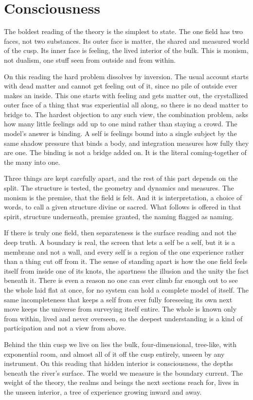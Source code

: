\section{Consciousness}

The boldest reading of the theory is the simplest to state. The one field has two faces, not two substances. Its outer face is matter, the shared and measured world of the cusp. Its inner face is feeling, the lived interior of the bulk. This is monism, not dualism, one stuff seen from outside and from within.

On this reading the hard problem dissolves by inversion. The usual account starts with dead matter and cannot get feeling out of it, since no pile of outside ever makes an inside. This one starts with feeling and gets matter out, the crystallized outer face of a thing that was experiential all along, so there is no dead matter to bridge to. The hardest objection to any such view, the combination problem, asks how many little feelings add up to one mind rather than staying a crowd. The model's answer is binding. A self is feelings bound into a single subject by the same shadow pressure that binds a body, and integration measures how fully they are one. The binding is not a bridge added on. It is the literal coming-together of the many into one.

Three things are kept carefully apart, and the rest of this part depends on the split. The structure is tested, the geometry and dynamics and measures. The monism is the premise, that the field is felt. And it is interpretation, a choice of words, to call a given structure divine or sacred. What follows is offered in that spirit, structure underneath, premise granted, the naming flagged as naming.

If there is truly one field, then separateness is the surface reading and not the deep truth. A boundary is real, the screen that lets a self be a self, but it is a membrane and not a wall, and every self is a region of the one experience rather than a thing cut off from it. The sense of standing apart is how the one field feels itself from inside one of its knots, the apartness the illusion and the unity the fact beneath it. There is even a reason no one can ever climb far enough out to see the whole laid flat at once, for no system can hold a complete model of itself. The same incompleteness that keeps a self from ever fully foreseeing its own next move keeps the universe from surveying itself entire. The whole is known only from within, lived and never overseen, so the deepest understanding is a kind of participation and not a view from above.

Behind the thin cusp we live on lies the bulk, four-dimensional, tree-like, with exponential room, and almost all of it off the cusp entirely, unseen by any instrument. On this reading that hidden interior is consciousness, the depths beneath the river's surface. The world we measure is the boundary current. The weight of the theory, the realms and beings the next sections reach for, lives in the unseen interior, a tree of experience growing inward and away.
